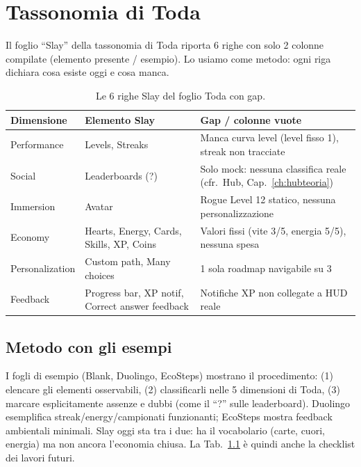 \chapter{Tassonomia di Toda}
\label{ch:toda}
Il foglio ``Slay'' della tassonomia di Toda riporta 6 righe con solo 2
colonne compilate (elemento presente / esempio). Lo usiamo come metodo:
ogni riga dichiara cosa esiste oggi e cosa manca.

\begin{table}[h]
\centering\small
\begin{tabular}{@{}llp{6cm}@{}}
\toprule
Dimensione & Elemento Slay & Gap / colonne vuote \\
\midrule
Performance & Levels, Streaks & Manca curva level (level fisso 1), streak non tracciate \\
Social & Leaderboards (?) & Solo mock: nessuna classifica reale (cfr.\ Hub, Cap.~\ref{ch:hubteoria}) \\
Immersion & Avatar & Rogue Level 12 statico, nessuna personalizzazione \\
Economy & Hearts, Energy, Cards, Skills, XP, Coins & Valori fissi (vite 3/5, energia 5/5), nessuna spesa \\
Personalization & Custom path, Many choices & 1 sola roadmap navigabile su 3 \\
Feedback & Progress bar, XP notif, Correct answer feedback & Notifiche XP non collegate a HUD reale \\
\bottomrule
\end{tabular}
\caption{Le 6 righe Slay del foglio Toda con gap.}
\label{tab:toda}
\end{table}

\section{Metodo con gli esempi}
I fogli di esempio (Blank, Duolingo, EcoSteps) mostrano il procedimento:
(1) elencare gli elementi osservabili, (2) classificarli nelle 5 dimensioni
di Toda, (3) marcare esplicitamente assenze e dubbi (come il ``?'' sulle
leaderboard). Duolingo esemplifica streak/energy/campionati funzionanti;
EcoSteps mostra feedback ambientali minimali. Slay oggi sta tra i due:
ha il vocabolario (carte, cuori, energia) ma non ancora l'economia chiusa.
La Tab.~\ref{tab:toda} è quindi anche la checklist dei lavori futuri.
